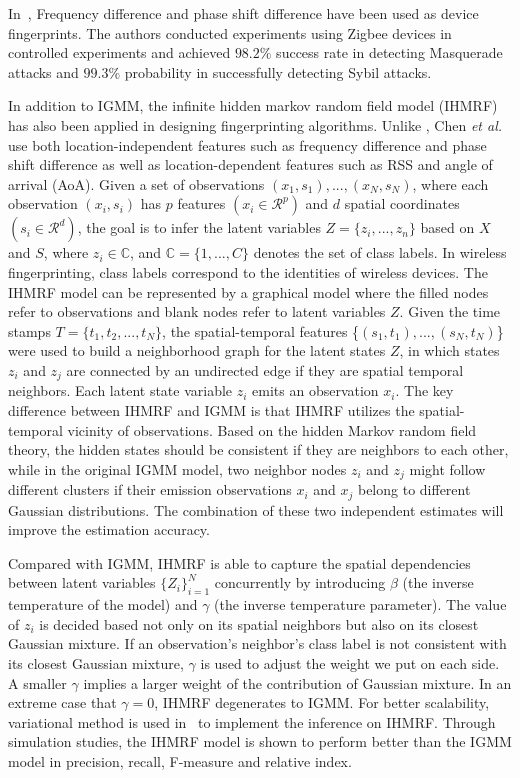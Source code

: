 \documentclass[journal,draftcls,onecolumn,11pt]{IEEEtran}
\begin{document}
In~\cite{Nguyen2011}, Frequency difference and phase shift difference have been used as device fingerprints. The authors conducted experiments using Zigbee devices in controlled experiments and achieved $98.2\%$ success rate in detecting Masquerade attacks and $99.3\%$ probability in successfully detecting Sybil attacks.

In addition to IGMM, the infinite hidden markov random field model (IHMRF) has also been applied in designing fingerprinting algorithms\cite{Chen}. Unlike \cite{Nguyen2011}, Chen {\it et al.}~\cite{Chen} use both location-independent features such as frequency difference and phase shift difference as well as location-dependent features such as RSS and angle of arrival (AoA). Given a set of observations {$(x_1,s_1), ..., (x_N, s_N)$}, where each observation $(x_i, s_i)$ has $p$ features $(x_i \in \mathcal{R}^p)$ and $d$ spatial coordinates $(s_i \in \mathcal{R}^d)$, the goal is to infer the latent variables $Z=\{z_i, ..., z_n\}$ based on $X$ and $S$, where $z_i \in \mathbb{C}$, and $\mathbb{C} = \{1,..., C\}$ denotes the set of class labels. In wireless fingerprinting, class labels correspond to the identities of wireless devices. The IHMRF model can be represented by a graphical model where the filled nodes refer to observations and blank nodes refer to latent variables $Z$. Given the time stamps $T=\{t_1, t_2, ...,t_N\}$, the spatial-temporal features \{$(s_1,t_1),...,(s_N,t_N)$\} were used to build a neighborhood graph for the latent states $Z$, in which states $z_i$ and $z_j$ are connected by an undirected edge if they are spatial temporal neighbors. Each latent state variable $z_i$ emits an observation $x_i$. The key difference between IHMRF and IGMM is that IHMRF utilizes the spatial-temporal vicinity of observations. Based on the hidden Markov random field theory, the hidden states should be consistent if they are neighbors to each other, while in the original IGMM model, two neighbor nodes $z_i$ and $z_j$ might follow different clusters if their emission observations $x_i$ and $x_j$ belong to different Gaussian distributions. The combination of these two independent estimates will improve the estimation accuracy. 

Compared with IGMM, IHMRF is able to capture the spatial dependencies between latent variables $\{Z_i\}^{N}_{i=1}$ concurrently by introducing $\beta$ (the inverse temperature of the model) and $\gamma$ (the inverse temperature parameter). The value of $z_i$ is decided based not only on its spatial neighbors but also on its closest Gaussian mixture. If an observation's neighbor's class label is not consistent with its closest Gaussian mixture, $\gamma$ is used to adjust the weight we put on each side. A smaller $\gamma$ implies a larger weight of the contribution of Gaussian mixture. In an extreme case that $\gamma = 0$, IHMRF degenerates to IGMM. For better scalability, variational method is used in~\cite{Chen} to implement the inference on IHMRF. Through simulation studies, the IHMRF model is shown to perform better than the IGMM model in precision, recall, F-measure and relative index.
\end{document}

